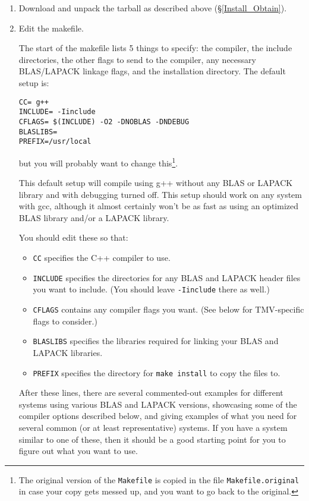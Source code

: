 \documentclass[twoside,letterpaper,11pt]{article}
\renewcommand{\tt}[1]{{\lstinline {#1}}}
\begin{document}
\begin{enumerate}
\item Download and unpack the tarball as described above (\S\ref{Install_Obtain}).

\item
Edit the makefile.

The start of the makefile lists 5 things to specify: the compiler,
the include directories, the other flags to send to the compiler, 
any necessary BLAS/LAPACK linkage flags, and the installation directory.
The default setup is:
\begin{verbatim}
CC= g++
INCLUDE= -Iinclude
CFLAGS= $(INCLUDE) -O2 -DNOBLAS -DNDEBUG
BLASLIBS=
PREFIX=/usr/local
\end{verbatim}
but you will probably want to change this\footnote{
The original version of the \texttt{Makefile}
is copied in the file \texttt{Makefile.original} in case your copy gets messed up, and you want to 
go back to the original.}.

This default setup will compile using g++ without any BLAS or LAPACK library and 
with debugging turned off. 
This setup should work on any system with gcc, although it almost certainly 
won't be as fast as using an optimized BLAS library and/or a LAPACK library.

You should edit these so that:
\begin{itemize}
\item \texttt{CC} specifies the C++ compiler to use.
\item \texttt{INCLUDE} specifies the directories for any BLAS and LAPACK header
files you want to include. (You should leave \tt{-Iinclude} there as well.)
\item \texttt{CFLAGS} contains any compiler flags you want.
(See below for TMV-specific flags to consider.)
\item \texttt{BLASLIBS} specifies the libraries required for linking your BLAS and LAPACK libraries.
\item \texttt{PREFIX} specifies the directory for \texttt{make install} to copy the files to.
\end{itemize}

After these lines, there are several commented-out examples for different systems 
using various BLAS
and LAPACK versions, showcasing some of the compiler options described below,
and giving examples of what you need for several common (or at least representative) systems.
If you have a system similar to one of these, then it should be a good 
starting point for you to figure out what you want to use.


\end{enumerate}
\end{document}
